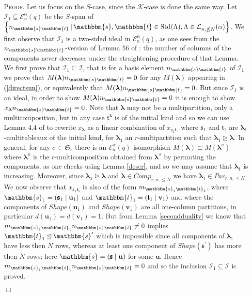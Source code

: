 \documentclass[10pt,a4,twoside,hidelinks,rm]{article}
\newcommand{\kk}{\mathcal{K}}
\newcommand\es{\mathbbm{s}}
\newcommand\et{\mathbbm{t}}
\newcommand\bu{\mathbf{u}}
\newcommand\bv{\mathbf{v}}
\newcommand{\bT}{\pmb{\mathfrak{t}}}
\newcommand{\Bs}{\pmb{\mathfrak{s}}}
\newcommand{\MCN}{{ {Comp}}_{r,n, \le N}}
\newcommand{\MPN}{{ {Par}}_{r,n, \le N}}
\newcommand{\Si}{\mathfrak{S}}
\newcommand{\std}{{\rm Std}}
\newcommand{\Ea}{ {\mathcal E}_n^{\alpha}(q)}
\newcommand\blambda{{\boldsymbol\lambda}}
\theoremstyle{plain}
\newenvironment{demo}
{\textsc{Proof.}} {\quad \hfill $\Box$}
\begin{document}
\begin{demo}
Let us focus on the $S$-case, since the $ \kk $-case is done the same way.
  Let $ {\mathcal I}_1 \subseteq \Ea$ be the $S$-span of
  $\left\{ n_{\es\et} \, | \, \es, \et \in \std(\Lambda), \Lambda \in {\cal L}_{n, \nleq N}(\alpha) \right\}$.
  We first observe that $ {\mathcal I}_1 $ is a two-sided ideal in $ \Ea$, as one
  sees from the $  n_{\es\et} $-version of Lemma 56 of \cite{ER}: the number of columns of the components
  never decreases under the straightening procedure of that Lemma.
We first prove that $ {\mathcal I}_1 \subseteq {\mathcal I} $, that is 
for a basis element $ n_{\es\et} $
of $ {\mathcal I}_1 $ we prove that
$  M(\blambda) n_{\es\et} = 0$ for any $ M(\blambda ) $ appearing
in (\ref{directsun}), or equivalently that $  M(\blambda) n_{\es\et} = 0$.
But since   
$ {\mathcal I}_1 $ is an ideal, in order to show $  M(\blambda) n_{\es\et} = 0$
it is enough to show $ x_{\blambda} n_{\es\et} = 0$. 
Note that $ \blambda $ may not be a multipartition, only a multicomposition, 
but in any case $ \bT^{\blambda} $ is of the initial kind and so we
can use Lemma 4.4 of \cite{Mur95} to rewrite $ x_{\blambda} $
as a linear combination
of $ x_{\Bs_1 \bT_1 } $ where $ \Bs_1 $ and $ \bT_1  $ are $\blambda_1 $-multitableaux of the initial kind, 
for $ \blambda_1 $ an $ r$-multipartition such that
$ \blambda_1 \unrhd \blambda $. In general,
for any $ \sigma \in \Si_r$ there is an $ \Ea$-isomorphism
$ M(\blambda) \cong M(\blambda^{\sigma})  $ 
where $ \blambda^{\sigma} $ is the $r$-multicomposition obtained
from $ \blambda^{\sigma} $ by permuting the components,
as one checks using
Lemma \ref{descr}, 
and so we may 
assume that $ \blambda_1 $ is increasing. Moreover, since $ \blambda_1 \unrhd \blambda$ 
and $ \blambda \in \MCN $ we have $ \blambda_1  \in   \MPN   $.
We now observe that 
$ x_{\Bs_1 \bT_1 } $ is also of the form $ m_{\es_1 \et_1} $, where
$ \es_1 = ( \Bs_1 \mid  \bu_1) $ and $ \et_1 = ( \bT_1 \mid  \bv_1) $ and 
where the components of $ Shape(\bu_1) $ and $ Shape(\bv_1) $ are all one-column partitions,
in particular $ d(\bu_1) = d(\bv_1) = 1$.
But from Lemma {\ref{secondduality}} we know that 
$  m_{\es_1 \et_1} n_{\es\et} \neq  0 $ implies
$ \et_1 \unlhd \es^{\prime} $
which is impossible since all
components of $  \blambda_1 $ have less then $ N$ rows, whereas at least one component of 
$ Shape(\Bs^{\prime}) $ has more then $ N $ rows; here $ \es = (\Bs \mid \bu)$ for some $ \bu$.
Hence
$  m_{\es_1 \et_1} n_{\es\et} =  0 $ and so 
the inclusion $ {\mathcal I}_1 \subseteq {\mathcal I} $
is proved.


\end{demo}
\end{document}
